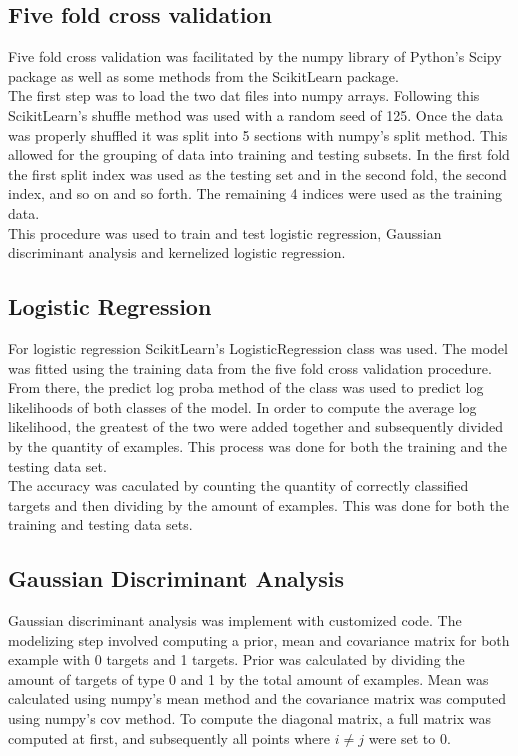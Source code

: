\documentclass{report}
\begin{document}
\subsection*{Five fold cross validation}
Five fold cross validation was facilitated by the numpy library of Python's Scipy
package as well as some methods from the ScikitLearn package.\\

The first step was to load the two dat files into numpy arrays. Following this ScikitLearn's
shuffle method was used with a random seed of 125. Once the data was properly shuffled
it was split into 5 sections with numpy's split method. This allowed for the grouping of data into
training and testing subsets. In the first fold the first split index was used as the
testing set and in the second fold, the second index, and so on and so forth. The remaining 4
indices were used as the training data.\\

This procedure was used to train and test logistic regression, Gaussian discriminant
analysis and kernelized logistic regression.
\subsection*{Logistic Regression}
For logistic regression ScikitLearn's LogisticRegression class was used. The model
was fitted using the training data from the five fold cross validation procedure.\\

From there, the predict log proba method of the class was used to predict log likelihoods
of both classes of the model. In order to compute the average log likelihood, the
greatest of the two were added together and subsequently divided by the quantity
of examples. This process was done for both the training and the testing data set.\\

The accuracy was caculated by counting the quantity of correctly classified targets
and then dividing by the amount of examples. This was done for both the training and
testing data sets.
\subsection*{Gaussian Discriminant Analysis}
Gaussian discriminant analysis was implement with customized code. The modelizing step
involved computing a prior, mean and covariance matrix for both example with 0 targets
and 1 targets. Prior was calculated by dividing the amount of targets of type 0 and 1 by
the total amount of examples. Mean was calculated using numpy's mean method and the
covariance matrix was computed using numpy's cov method. To compute the diagonal matrix,
a full matrix was computed at first, and subsequently all points where $i\neq j$ were set to 0.\\
\end{document}
